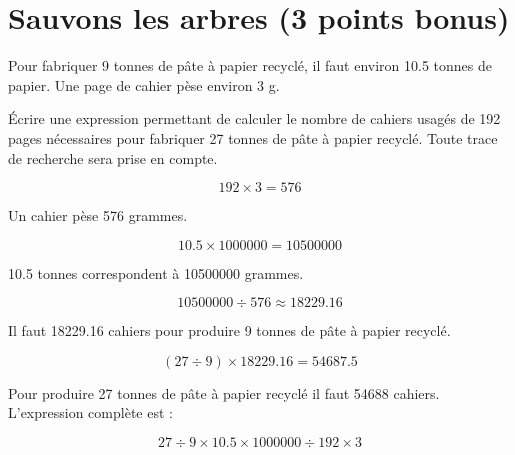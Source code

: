 \section{Sauvons les arbres (3 points bonus)}

Pour fabriquer 9 tonnes de pâte à papier recyclé, il faut environ \num{10.5} tonnes de papier. Une page de cahier pèse environ 3 g.

\begin{questions}
	\question[3] \'Ecrire une expression permettant de calculer le nombre de cahiers usagés de 192 pages nécessaires pour fabriquer 27 tonnes de pâte à papier recyclé. Toute trace de recherche sera prise en compte.
\end{questions}

\begin{solution}
	\begin{equation*}
		192 \times 3 = 576
	\end{equation*}
	
	Un cahier pèse 576 grammes.
	
	\begin{equation*}
		\num{10.5} \times \num{1000000} =\num{10 500 000}
	\end{equation*}
	
	\num{10.5} tonnes correspondent à \num{10 500 000} grammes.
	
	\begin{equation*}
		\num{10 500 000} \div 576 \approx \num{18229.16} 
	\end{equation*}
	
	Il faut \num{18229.16} cahiers pour produire 9 tonnes de pâte à papier recyclé.
	
	\begin{equation*}
		 (27 \div 9) \times \num{18229.16} = \num{54687.5}
	\end{equation*}
	
	Pour produire 27 tonnes de pâte à papier recyclé il faut \num{54688} cahiers.\\
	
	L'expression complète est :
	
	\begin{equation*}
		27 \div 9 \times \num{10.5} \times \num{1000000} \div 192 \times 3
	\end{equation*}
\end{solution}